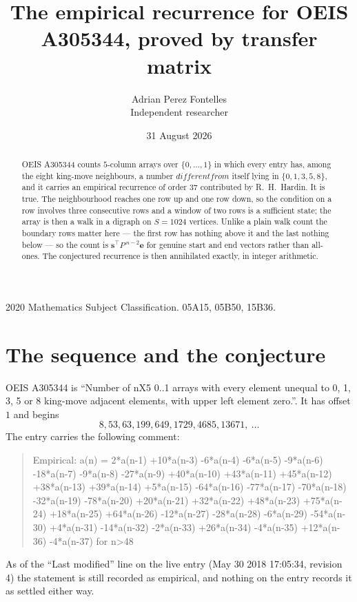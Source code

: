\documentclass[11pt,a4paper]{article}
\title{The empirical recurrence for OEIS A305344, proved by transfer matrix}
\author{Adrian Perez Fontelles\\ \small Independent researcher}
\date{31 August 2026}
\theoremstyle{plain}
\theoremstyle{definition}
\begin{document}
\maketitle

\begin{abstract}
OEIS A305344 counts $5$-column arrays over $\{0,\dots,1\}$ in which every entry has,
among the eight king-move neighbours, a number $different from$ itself lying in $\{0,1,3,5,8\}$, and it carries an empirical
recurrence of order $37$ contributed by R.~H.~Hardin. It is true. The neighbourhood
reaches one row up and one row down, so the condition on a row involves three consecutive
rows and a window of two rows is a sufficient state; the array is then a walk in a digraph
on $S=1024$ vertices. Unlike a plain walk count the boundary rows matter here --- the first
row has nothing above it and the last nothing below --- so the count is
$\mathbf{s}^{\!\top}P^{\,n-2}\mathbf{e}$ for genuine start and end vectors rather than
all-ones. The conjectured recurrence is then annihilated exactly, in integer arithmetic.
\end{abstract}

\noindent\small 2020 Mathematics Subject Classification. 05A15, 05B50, 15B36.\normalsize

\section{The sequence and the conjecture}

OEIS A305344 is ``Number of nX5 0..1 arrays with every element unequal to 0, 1, 3, 5 or 8 king-move adjacent elements, with upper left element zero.''. It has offset
$1$ and begins
\[
8, 53, 63, 199, 649, 1729, 4685, 13671,\ \dots
\]
The entry carries the following comment:
\begin{quote}\small
Empirical: a(n) = 2*a(n-1) +10*a(n-3) -6*a(n-4) -6*a(n-5) -9*a(n-6) -18*a(n-7) -9*a(n-8) -27*a(n-9) +40*a(n-10) +43*a(n-11) +45*a(n-12) +38*a(n-13) +39*a(n-14) +5*a(n-15) -64*a(n-16) -77*a(n-17) -70*a(n-18) -32*a(n-19) -78*a(n-20) +20*a(n-21) +32*a(n-22) +48*a(n-23) +75*a(n-24) +18*a(n-25) +64*a(n-26) -12*a(n-27) -28*a(n-28) -6*a(n-29) -54*a(n-30) +4*a(n-31) -14*a(n-32) -2*a(n-33) +26*a(n-34) -4*a(n-35) +12*a(n-36) -4*a(n-37) for n>48
\end{quote}
As of the ``Last modified'' line on the live entry (May 30 2018 17:05:34, revision
4) the statement is still recorded as empirical, and nothing on the entry
records it as settled either way.
\end{document}
